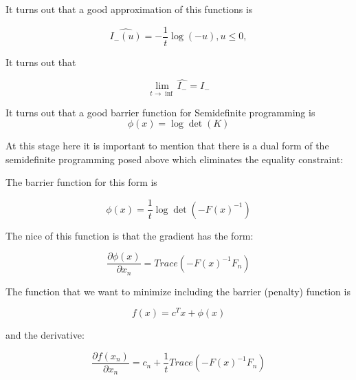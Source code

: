 \documentclass[12pt,letterpaper,doublespaced,ETD,dvips,proposal]{gtthesis}
\begin{document}
\begin{Body}
It turns out that a good approximation of this functions is

\begin{equation}
\hat{I_{-}(u)} = -\frac{1}{t}\log(-u), u\leq 0,
\end{equation}

It turns out that

\begin{equation}
\lim_{t\rightarrow \inf} \hat{I_{-}} = I_{-}
\end{equation}

It turns out that a good barrier function for Semidefinite
programming is
\begin{equation}
\phi(x)=\log \det(K)
\end{equation}

At this stage here it is important to mention that there is a dual
form of the semidefinite programming posed above which eliminates
the equality constraint:

\vspace{1cm}


\vspace{1cm}

The barrier function for this form is

\begin{equation}
\phi(x)=\frac{1}{t}\log\det(-F(x)^{-1})
\end{equation}

The nice of this function is that the gradient has the form:

\begin{equation}
\frac{\partial\phi(x)}{\partial x_{n}} = Trace(-F(x)^{-1}F_n)
\end{equation}

The function that we want to minimize including the barrier
(penalty) function is

\begin{equation}
f(x)=c^Tx+\phi(x)
\end{equation}

and the derivative:

\begin{equation}
\frac{\partial f(x_n)}{\partial x_{n}} = c_n
+\frac{1}{t}Trace(-F(x)^{-1}F_n)
\end{equation}


\end{Body}
\end{document}

